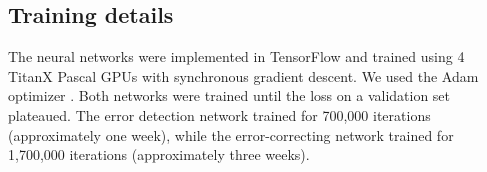 \documentclass{article}
\begin{document}
\begin{appendices}
\section{Training details}
The neural networks were implemented in TensorFlow \cite{tensorflow} and trained using 4 TitanX Pascal GPUs with synchronous gradient descent. We used the Adam optimizer \cite{adam}.   Both networks were trained until the loss on a validation set plateaued. The error detection network trained for 700,000 iterations (approximately one week), while the error-correcting network trained for 1,700,000 iterations (approximately three weeks).

\end{appendices}


\end{document}
